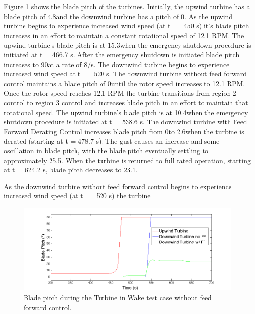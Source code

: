 Figure \ref{fig6-30} shows the blade pitch of the turbines. Initially, the upwind turbine has a blade pitch of 4.8\degree and the downwind turbine has a pitch of 0\degree. As the upwind turbine begins to experience increased wind speed (at t = ~450 s) it's blade pitch increases in an effort to maintain a constant rotational speed of 12.1 RPM. The upwind turbine's blade pitch is at 15.3\degree when the emergency shutdown procedure is initiated at t = 466.7 s. After the emergency shutdown is initiated blade pitch increases to 90\degree at a rate of 8\degree /s. The downwind turbine begins to experience increased wind speed at t = ~520 s. The downwind turbine without feed forward control maintains a blade pitch of 0\degree until the rotor speed increases to 12.1 RPM. Once the rotor speed reaches 12.1 RPM the turbine transitions from region 2 control to region 3 control and increases blade pitch in an effort to maintain that rotational speed. The upwind turbine's blade pitch is at 10.4\degree when the emergency shutdown procedure is initiated at t = 538.6 s. The downwind turbine with Feed Forward Derating Control increases blade pitch from 0\degree to 2.6\degree when the turbine is derated (starting at t = 478.7 s). The gust causes an increase and some oscillation in blade pitch, with the blade pitch eventually settling to approximately 25.5\degree. When the turbine is returned to full rated operation, starting at t = 624.2 s, blade pitch decreases to 23.1\degree.

As the downwind turbine without feed forward control begins to experience increased wind speed (at t = ~520 s) the turbine 

\begin{figure}[!htbp] 
	\centering
		\includegraphics[width = \linewidth]{Figures/ch6Figures/fig6-30.png}

	\caption{Blade pitch during the Turbine in Wake test case without feed forward control.}
	\label{fig6-30}
\end{figure}

